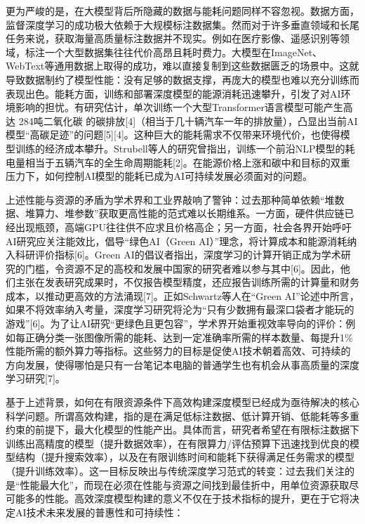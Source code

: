 更为严峻的是，在大模型背后所隐藏的数据与能耗问题同样不容忽视。数据方面，监督深度学习的成功极大依赖于大规模标注数据集。然而对于许多垂直领域和长尾任务来说，获取海量高质量标注数据并不现实。例如在医疗影像、遥感识别等领域，标注一个大型数据集往往代价高昂且耗时费力。大模型在ImageNet、WebText等通用数据上取得的成功，难以直接复制到这些数据匮乏的场景中。这就导致数据制约了模型性能：没有足够的数据支撑，再庞大的模型也难以充分训练而表现出色。能耗方面，训练和部署深度模型的能源消耗迅速攀升，引发了对AI环境影响的担忧。有研究估计，单次训练一个大型Transformer语言模型可能产生高达 284吨二氧化碳 的碳排放[4]（相当于几十辆汽车一年的排放量），凸显出当前AI模型“高碳足迹”的问题[5][4]。这种巨大的能耗需求不仅带来环境代价，也使得模型训练的经济成本攀升。Strubell等人的研究曾指出，训练一个前沿NLP模型的耗电量相当于五辆汽车的全生命周期能耗[2]。在能源价格上涨和碳中和目标的双重压力下，如何控制AI模型的能耗已成为AI可持续发展必须面对的问题。

上述性能与资源的矛盾为学术界和工业界敲响了警钟：过去那种简单依赖“堆数据、堆算力、堆参数”获取更高性能的范式难以长期维系。一方面，硬件供应链已经出现瓶颈，高端GPU往往供不应求且价格高企；另一方面，社会各界开始呼吁AI研究应关注能效比，倡导“绿色AI（Green AI）”理念，将计算成本和能源消耗纳入科研评价指标[6]。Green AI的倡议者指出，深度学习的计算开销正成为学术研究的门槛，令资源不足的高校和发展中国家的研究者难以参与其中[6]。因此，他们主张在发表研究成果时，不仅报告模型精度，还应报告训练所需的计算量和财务成本，以推动更高效的方法涌现[7]。正如Schwartz等人在“Green AI”论述中所言，如果不将效率纳入考量，深度学习研究将沦为“只有少数拥有最深口袋者才能玩的游戏”[6]。为了让AI研究“更绿色且更包容”，学术界开始重视效率导向的评价：例如每正确分类一张图像所需的能耗、达到一定准确率所需的样本数量、每提升1\%性能所需的额外算力等指标。这些努力的目标是促使AI技术朝着高效、可持续的方向发展，使得哪怕是只有一台笔记本电脑的普通学生也有机会从事高质量的深度学习研究[7]。

基于上述背景，如何在有限资源条件下高效构建深度模型已经成为亟待解决的核心科学问题。所谓高效构建，指的是在满足低标注数据、低计算开销、低能耗等多重约束的前提下，最大化模型的性能产出。具体而言，研究者希望在有限标注数据下训练出高精度的模型（提升数据效率），在有限算力/评估预算下迅速找到优良的模型结构（提升搜索效率），以及在有限训练时间和能耗下获得满足任务需求的模型（提升训练效率）。这一目标反映出与传统深度学习范式的转变：过去我们关注的是“性能最大化”，而现在必须在性能与资源之间找到最佳折中，用单位资源获取尽可能多的性能。高效深度模型构建的意义不仅在于技术指标的提升，更在于它将决定AI技术未来发展的普惠性和可持续性：

